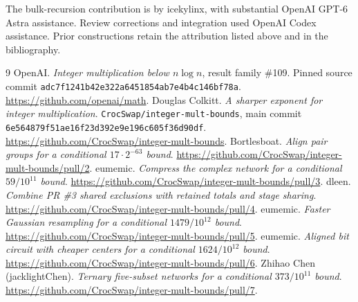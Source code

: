 \documentclass[11pt]{article}
\numberwithin{equation}{section}
\begin{document}
The bulk-recursion contribution is by icekylinx, with substantial
OpenAI GPT-6 Astra assistance. Review corrections and integration used
OpenAI Codex assistance. Prior constructions retain the attribution
listed above and in the bibliography.

\clearpage
{\small\raggedright
\begin{thebibliography}{9}
 OpenAI.
\emph{Integer multiplication below $n\log n$}, result family \#109.
Pinned source commit \texttt{adc7f1241b42e322a6451854ab7e4b4c146bf78a}.
\url{https://github.com/openai/math}.
 Douglas Colkitt.
\emph{A sharper exponent for integer multiplication}.
\texttt{CrocSwap/integer-mult-bounds}, main commit
\texttt{6e564879f51ae16f23d392e9e196c605f36d90df}.
\url{https://github.com/CrocSwap/integer-mult-bounds}.
 Bortlesboat.
\emph{Align pair groups for a conditional $17\cdot2^{-63}$ bound}.
\url{https://github.com/CrocSwap/integer-mult-bounds/pull/2}.
 eumemic.
\emph{Compress the complex network for a conditional $59/10^{11}$ bound}.
\url{https://github.com/CrocSwap/integer-mult-bounds/pull/3}.
 dleen.
\emph{Combine PR \#3 shared exclusions with retained totals and stage sharing}.
\url{https://github.com/CrocSwap/integer-mult-bounds/pull/4}.
 eumemic.
\emph{Faster Gaussian resampling for a conditional $1479/10^{12}$ bound}.
\url{https://github.com/CrocSwap/integer-mult-bounds/pull/5}.
 eumemic.
\emph{Aligned bit circuit with cheaper centers for a conditional
$1624/10^{12}$ bound}.
\url{https://github.com/CrocSwap/integer-mult-bounds/pull/6}.
 Zhihao Chen (jacklightChen).
\emph{Ternary five-subset networks for a conditional $373/10^{11}$ bound}.
\url{https://github.com/CrocSwap/integer-mult-bounds/pull/7}.
\end{thebibliography}
}
\end{document}
